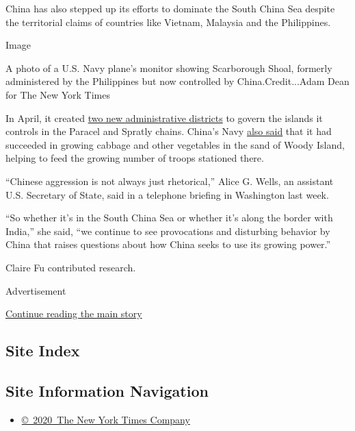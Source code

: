 China has also stepped up its efforts to dominate the South China Sea
despite the territorial claims of countries like Vietnam, Malaysia and
the Philippines.

Image

A photo of a U.S. Navy plane's monitor showing Scarborough Shoal,
formerly administered by the Philippines but now controlled by
China.Credit...Adam Dean for The New York Times

In April, it created
\href{https://amti.csis.org/fishing-while-the-water-is-muddy-chinas-newly-announced-administrative-districts-in-the-south-china-sea/}{two
new administrative districts} to govern the islands it controls in the
Paracel and Spratly chains. China's Navy
\href{https://www.globaltimes.cn/content/1188873.shtml}{also said} that
it had succeeded in growing cabbage and other vegetables in the sand of
Woody Island, helping to feed the growing number of troops stationed
there.

``Chinese aggression is not always just rhetorical,'' Alice G. Wells, an
assistant U.S. Secretary of State, said in a telephone briefing in
Washington last week.

``So whether it's in the South China Sea or whether it's along the
border with India,'' she said, ``we continue to see provocations and
disturbing behavior by China that raises questions about how China seeks
to use its growing power.''

Claire Fu contributed research.

Advertisement

\protect\hyperlink{after-bottom}{Continue reading the main story}

\hypertarget{site-index}{%
\subsection{Site Index}\label{site-index}}

\hypertarget{site-information-navigation}{%
\subsection{Site Information
Navigation}\label{site-information-navigation}}

\begin{itemize}
\tightlist
\item
  \href{https://help.nytimes3xbfgragh.onion/hc/en-us/articles/115014792127-Copyright-notice}{©~2020~The
  New York Times Company}
\end{itemize}

